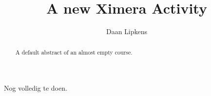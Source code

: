 \documentclass{ximera}
\title{A new Ximera Activity}
\author{Daan Lipkens}
\begin{document}
\begin{abstract}
    A default abstract of an almost empty course.
\end{abstract}
\maketitle
\label{h:vec}

Nog volledig te doen.
\end{document}
